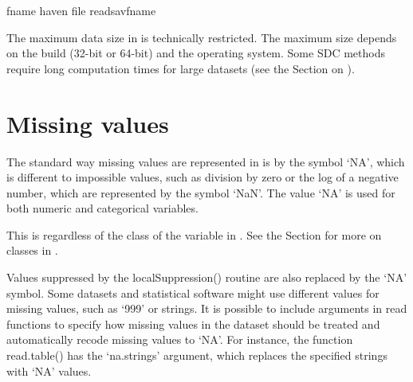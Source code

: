 \documentclass[letterpaper,10pt,english]{sphinxmanual}
\begin{document}
\def\sphinxLiteralBlockLabel{\label{\detokenize{sdcMicro:code75}}}
%
\begin{sphinxVerbatim}[commandchars=\\\{\},numbers=left,firstnumber=1,stepnumber=1]
 
fname   
haven 
file  read\PYGZus{}savfname
\end{sphinxVerbatim}

The maximum data size in  is technically restricted. The maximum size
depends on the  build (32-bit or 64-bit) and the operating system.
Some SDC methods require long computation times for large datasets (see the Section
on {\hyperref[\detokenize{sdcMicro:computation-time}]{}}).


\section{Missing values}
\label{\detokenize{sdcMicro:missing-values}}
The standard way missing values are represented in  is by the symbol
‘NA’, which is different to impossible values, such as division by zero
or the log of a negative number, which are represented by the symbol
‘NaN’. The value ‘NA’ is used for both numeric and categorical
variables. %
\begin{footnote}[4]\sphinxAtStartFootnote
This is regardless of the class of the variable in . See the Section
{\hyperref[\detokenize{sdcMicro:classes-in-r}]{}} for more on classes in .
%
\end{footnote} Values suppressed by the
localSuppression() routine are also replaced by the ‘NA’ symbol. Some
datasets and statistical software might use different values for missing
values, such as ‘999’ or strings. It is possible to include arguments in
read functions to specify how missing values in the dataset should be
treated and automatically recode missing values to ‘NA’. For instance,
the function read.table() has the ‘na.strings’ argument, which replaces
the specified strings with ‘NA’ values.
\end{document}
